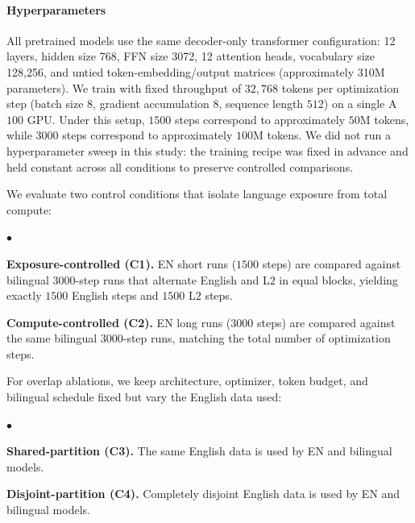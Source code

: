 \documentclass[11pt]{article}
\newcommand{\squishlist}{
    \begin{list}{$\bullet$}
    { \setlength{\itemsep}{0pt}
        \setlength{\parsep}{1pt}
        \setlength{\topsep}{1pt}
        \setlength{\partopsep}{0pt}
        \setlength{\leftmargin}{1em} %
        \setlength{\labelwidth}{1em}
        \setlength{\labelsep}{0.5em} } }
\newcommand{\squishend}{
    \end{list}  }
\newcommand{\ENONLY}{\textsc{EN}}
\newcommand{\RegimeOne}{Exposure-controlled (C1)}
\newcommand{\RegimeTwo}{Compute-controlled (C2)}
\newcommand{\SetupAName}{Shared-partition (C3)}
\newcommand{\SetupBName}{Disjoint-partition (C4)}
\begin{document}
\paragraph{Hyperparameters}
All pretrained models use the same decoder-only transformer configuration: 12 layers, hidden size 768, FFN size 3072, 12 attention heads, vocabulary size 128{,}256, and untied token-embedding/output matrices (approximately 310M parameters). We train with fixed throughput of $32{,}768$ tokens per optimization step (batch size $8$, gradient accumulation $8$, sequence length $512$) on a single A$100$ GPU. Under this setup, $1500$ steps correspond to approximately $50$M tokens, while $3000$ steps correspond to approximately $100$M tokens.
We did not run a hyperparameter sweep in this study: the training recipe was fixed in advance and held constant across all conditions to preserve controlled comparisons.

We evaluate two control conditions that isolate language exposure from total compute:
\squishlist
    \item \textbf{\RegimeOne.} \ENONLY{} short runs ($1500$ steps) are compared against bilingual $3000$-step runs that alternate English and L$2$ in equal blocks, yielding exactly $1500$ English steps and $1500$ L$2$ steps.
    \item \textbf{\RegimeTwo.} \ENONLY{} long runs ($3000$ steps) are compared against the same bilingual $3000$-step runs, matching the total number of optimization steps.
\squishend

For overlap ablations, we keep architecture, optimizer, token budget, and bilingual schedule fixed but vary the English data used:
\squishlist
    \item \textbf{\SetupAName.} The same English data is used by \ENONLY{} and bilingual models.
    \item \textbf{\SetupBName.} Completely disjoint English data is used by \ENONLY{} and bilingual models.
\squishend
\end{document}
